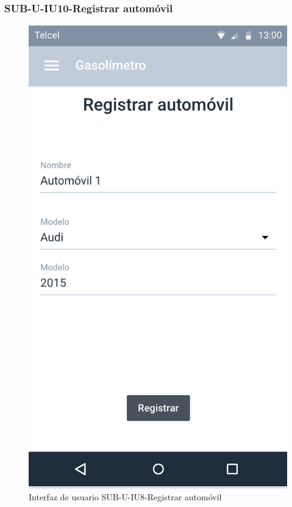 \subsubsection{SUB-U-IU10-Registrar automóvil}\label{SUB-U-IU10}
\begin{figure}[H]
	\centering
	\includegraphics[scale=1]{Capitulo4/software/submodulos/usuarios/images/sub-u-iu10}
	\caption{Interfaz de usuario SUB-U-IU8-Registrar automóvil}
	\label{fig:sub-u-iu10}
\end{figure}